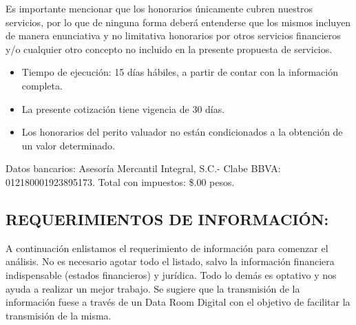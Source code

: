 \documentclass[5pt,letter]{article}
\begin{document}
 Es importante mencionar que los honorarios únicamente cubren nuestros servicios, por lo que
de ninguna forma deberá entenderse que los mismos incluyen de manera enunciativa y no
limitativa honorarios por otros servicios financieros y/o cualquier otro concepto no incluido
en la presente propuesta de servicios.\\
 
 \begin{itemize}
\item Tiempo de ejecución: 15 días hábiles, a partir de contar con la información completa.\\
\item  La presente cotización tiene vigencia de 30 días.\\
\item  Los honorarios del perito valuador no están condicionados a la obtención de un valor determinado.\\
\end{itemize}
 
Datos bancarios: Asesoría Mercantil Integral, S.C.- Clabe BBVA: 012180001923895173.
Total con impuestos: \$\totalMasIva.00 pesos.
 
\begin{center}
\section{REQUERIMIENTOS DE INFORMACIÓN:}
\end{center}
 
 A continuación enlistamos el requerimiento de información para comenzar el análisis. No es necesario agotar todo el listado, salvo la información financiera indispensable (estados financieros) y jurídica. Todo lo demás es optativo y nos ayuda a realizar un mejor trabajo. Se sugiere que la transmisión de la información fuese a través de un Data Room Digital con el objetivo de facilitar la transmisión de la misma.\\
 
\end{document}
